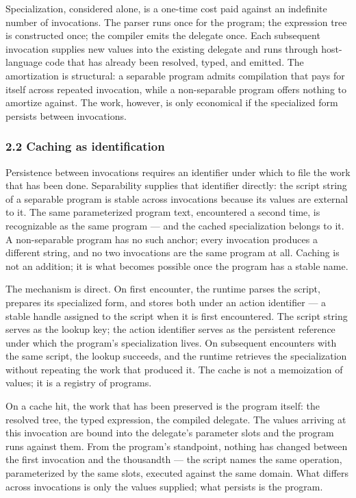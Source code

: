 \documentclass[
]{article}
\begin{document}
Specialization, considered alone, is a one-time cost paid against an
indefinite number of invocations. The parser runs once for the program;
the expression tree is constructed once; the compiler emits the delegate
once. Each subsequent invocation supplies new values into the existing
delegate and runs through host-language code that has already been
resolved, typed, and emitted. The amortization is structural: a
separable program admits compilation that pays for itself across
repeated invocation, while a non-separable program offers nothing to
amortize against. The work, however, is only economical if the
specialized form persists between invocations.

\subsubsection{2.2 Caching as
identification}\label{caching-as-identification}

Persistence between invocations requires an identifier under which to
file the work that has been done. Separability supplies that identifier
directly: the script string of a separable program is stable across
invocations because its values are external to it. The same
parameterized program text, encountered a second time, is recognizable
as the same program --- and the cached specialization belongs to it. A
non-separable program has no such anchor; every invocation produces a
different string, and no two invocations are the same program at all.
Caching is not an addition; it is what becomes possible once the program
has a stable name.

The mechanism is direct. On first encounter, the runtime parses the
script, prepares its specialized form, and stores both under an action
identifier --- a stable handle assigned to the script when it is first
encountered. The script string serves as the lookup key; the action
identifier serves as the persistent reference under which the program's
specialization lives. On subsequent encounters with the same script, the
lookup succeeds, and the runtime retrieves the specialization without
repeating the work that produced it. The cache is not a memoization of
values; it is a registry of programs.

On a cache hit, the work that has been preserved is the program itself:
the resolved tree, the typed expression, the compiled delegate. The
values arriving at this invocation are bound into the delegate's
parameter slots and the program runs against them. From the program's
standpoint, nothing has changed between the first invocation and the
thousandth --- the script names the same operation, parameterized by the
same slots, executed against the same domain. What differs across
invocations is only the values supplied; what persists is the program.
\end{document}
